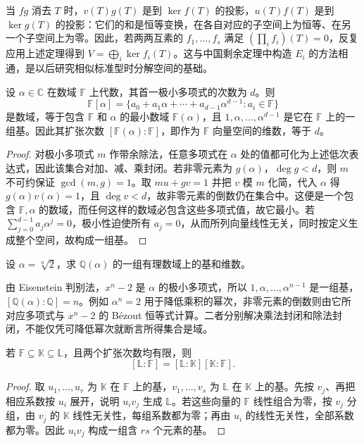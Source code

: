 当 $fg$ 消去 $T$ 时，$v(T)g(T)$ 是到 $\ker f(T)$ 的投影，$u(T)f(T)$ 是到 $\ker g(T)$ 的投影：它们的和是恒等变换，在各自对应的子空间上为恒等、在另一个子空间上为零。因此，若两两互素的 $f_1,\ldots,f_s$ 满足 $(\prod_i f_i)(T)=0$，反复应用上述定理得到 $V=\bigoplus_i\ker f_i(T)$。这与中国剩余定理中构造 $E_i$ 的方法相通，是以后研究相似标准型时分解空间的基础。

\begin{theorem}[代数元生成的数域]
\label{thm:poly-generated-field}
设 $\alpha\in\mathbb C$ 在数域 $\mathbb F$ 上代数，其首一极小多项式的次数为 $d$。则
\[
    \mathbb F[\alpha]=\{a_0+a_1\alpha+\cdots+a_{d-1}\alpha^{d-1}:a_i\in\mathbb F\}
\]
是数域，等于包含 $\mathbb F$ 和 $\alpha$ 的最小数域 $\mathbb F(\alpha)$，且 $1,\alpha,\ldots,\alpha^{d-1}$ 是它在 $\mathbb F$ 上的一组基。因此其扩张次数 $[\mathbb F(\alpha):\mathbb F]$，即作为 $\mathbb F$ 向量空间的维数，等于 $d$。
\end{theorem}
\begin{proof}
对极小多项式 $m$ 作带余除法，任意多项式在 $\alpha$ 处的值都可化为上述低次表达式，因此该集合对加、减、乘封闭。若非零元素为 $g(\alpha)$，$\deg g<d$，则 $m$ 不可约保证 $\gcd(m,g)=1$。取 $mu+gv=1$ 并把 $v$ 模 $m$ 化简，代入 $\alpha$ 得 $g(\alpha)v(\alpha)=1$，且 $\deg v<d$，故非零元素的倒数仍在集合中。这便是一个包含 $\mathbb F,\alpha$ 的数域，而任何这样的数域必包含这些多项式值，故它最小。若 $\sum_{j=0}^{d-1}a_j\alpha^j=0$，极小性迫使所有 $a_j=0$，从而所列向量线性无关，同时按定义生成整个空间，故构成一组基。
\end{proof}

\begin{example}
\label{ex:poly-radical-field}
设 $\alpha=\sqrt[n]{2}$，求 $\mathbb Q(\alpha)$ 的一组有理数域上的基和维数。
\end{example}
\begin{solve}
由 Eisenstein 判别法，$x^n-2$ 是 $\alpha$ 的极小多项式，所以 $1,\alpha,\ldots,\alpha^{n-1}$ 是一组基，$[\mathbb Q(\alpha):\mathbb Q]=n$。例如 $\alpha^n=2$ 用于降低乘积的幂次，非零元素的倒数则由它所对应多项式与 $x^n-2$ 的 Bézout 恒等式计算。二者分别解决乘法封闭和除法封闭，不能仅凭可降低幂次就断言所得集合是域。
\end{solve}

\begin{proposition}[扩张次数的乘法公式]
\label{prop:poly-tower-degree}
若 $\mathbb F\subseteq\mathbb K\subseteq\mathbb L$，且两个扩张次数均有限，则
\[
    [\mathbb L:\mathbb F]=[\mathbb L:\mathbb K][\mathbb K:\mathbb F].
\]
\end{proposition}
\begin{proof}
取 $u_1,\ldots,u_r$ 为 $\mathbb K$ 在 $\mathbb F$ 上的基，$v_1,\ldots,v_s$ 为 $\mathbb L$ 在 $\mathbb K$ 上的基。先按 $v_j$、再把相应系数按 $u_i$ 展开，说明 $u_iv_j$ 生成 $\mathbb L$。若这些向量的 $\mathbb F$ 线性组合为零，按 $v_j$ 分组，由 $v_j$ 的 $\mathbb K$ 线性无关性，每组系数都为零；再由 $u_i$ 的线性无关性，全部系数都为零。因此 $u_iv_j$ 构成一组含 $rs$ 个元素的基。
\end{proof}


